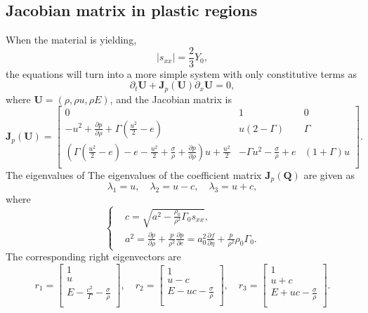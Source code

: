 \documentclass[review]{elsarticle}
\begin{document}
\subsection{Jacobian matrix in  plastic  regions}
When the material is yielding,
\begin{equation}
  |s_{xx}| = \frac{2}{3}Y_0,
\end{equation}
the equations will turn into a more simple system with only constitutive terms as
\begin{equation}
  \partial_t \mathbf{{U}} + \mathbf{J}_p(\mathbf{U})\partial_x \mathbf{{U}}= 0,
\end{equation}
where $\mathbf{U} = (\rho, \rho u, \rho E )$, and the Jacobian matrix is
\begin{equation}
\mathbf{J}_p(\mathbf{U}) = \left[\begin{array}{lll}
      0 & 1 & 0   \\
      -u^2 + \frac{\partial p}{\partial \rho} +\Gamma(\frac{u^2}{2}-e)& u(2-\Gamma)& \Gamma \\
	  (\Gamma(\frac{u^2}{2}-e)-e-\frac{u^2}{2}+\frac{\sigma}{\rho}+\frac{\partial p}{\partial \rho})u +\frac{u^2}{2} & -\Gamma u^2 -\frac{\sigma}{\rho} +e & (1+\Gamma)u\\
\end{array}
\right].
\end{equation} 
The eigenvalues of 
The eigenvalues of the coefficient matrix $\mathbf{J}_p(\mathbf{Q})$ are given as
$$\lambda_1 = u,\quad \lambda_2 = u-c, \quad \lambda_3 = u+c,$$
where 
\begin{equation}\label{eq:c_p}
  \left\{ \begin{aligned}
	  & c = \sqrt{a^2-\frac{\rho_0}{\rho^2}\Gamma_0 s_{xx}} ,\\
    &   a^2 = \frac{\partial p}{\partial \rho} + \frac{p}{\rho^2}\frac{\partial p}{\partial e} = a^2_0 \frac{\partial f}{\partial \eta} + \frac{p}{\rho^2}\rho_0 \Gamma_0.
      \end{aligned} \right.
    \end{equation}
The corresponding right eigenvectors are
\begin{equation}\label{eq:eivp}
  r_1 = \left[ \begin{array}{l}
	  1 \\
	  u \\
	  E-\frac{c^2}{\Gamma}-\frac{\sigma}{\rho}\\
  \end{array}\right], \quad
 r_2 = \left[ \begin{array}{l}
	  1 \\
	  u-c \\
	  E-uc-\frac{\sigma}{\rho}\\
  \end{array}\right], \quad
 r_3 = \left[ \begin{array}{l}
	  1 \\
	  u+c \\
	  E+uc-\frac{\sigma}{\rho}\\
  \end{array}\right].
\end{equation}
\end{document}
